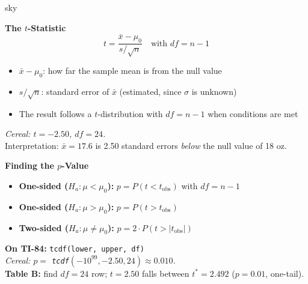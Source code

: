\documentclass[10pt]{article}
\begin{document}
\begin{skillbox}{sky}
\begin{minipage}[t]{0.48\linewidth}
    \textbf{The $t$-Statistic}
    \[
      t = \frac{\bar x - \mu_0}{s/\sqrt{n}} \quad \text{with } df = n - 1
    \]
    \begin{itemize}
        \item $\bar x - \mu_0$: how far the sample mean is from the null value
        \item $s/\sqrt{n}$: standard error of $\bar x$ (estimated, since $\sigma$ is unknown)
        \item The result follows a $t$-distribution with $df = n - 1$ when conditions are met
    \end{itemize}
    \textit{Cereal: $t = -2.50$, $df = 24$.}\\
    Interpretation: $\bar x = 17.6$ is 2.50 standard errors \emph{below} the null value of 18 oz.
\end{minipage}
\hfill
\begin{minipage}[t]{0.48\linewidth}
    \textbf{Finding the $p$-Value}
    \begin{itemize}
        \item \textbf{One-sided ($H_a: \mu < \mu_0$):} $p = P(t < t_{\text{obs}})$ with $df = n-1$
        \item \textbf{One-sided ($H_a: \mu > \mu_0$):} $p = P(t > t_{\text{obs}})$
        \item \textbf{Two-sided ($H_a: \mu \ne \mu_0$):} $p = 2 \cdot P(t > |t_{\text{obs}}|)$
    \end{itemize}
    \textbf{On TI-84:} \texttt{tcdf(lower, upper, df)}\\
    \textit{Cereal: $p = $ \texttt{tcdf}$(-10^{99}, -2.50, 24) \approx 0.010$.}\\[4pt]
    \textbf{Table B:} find $df = 24$ row; $t = 2.50$ falls between $t^* = 2.492$ ($p = 0.01$, one-tail).
\end{minipage}
\end{skillbox}
\end{document}
